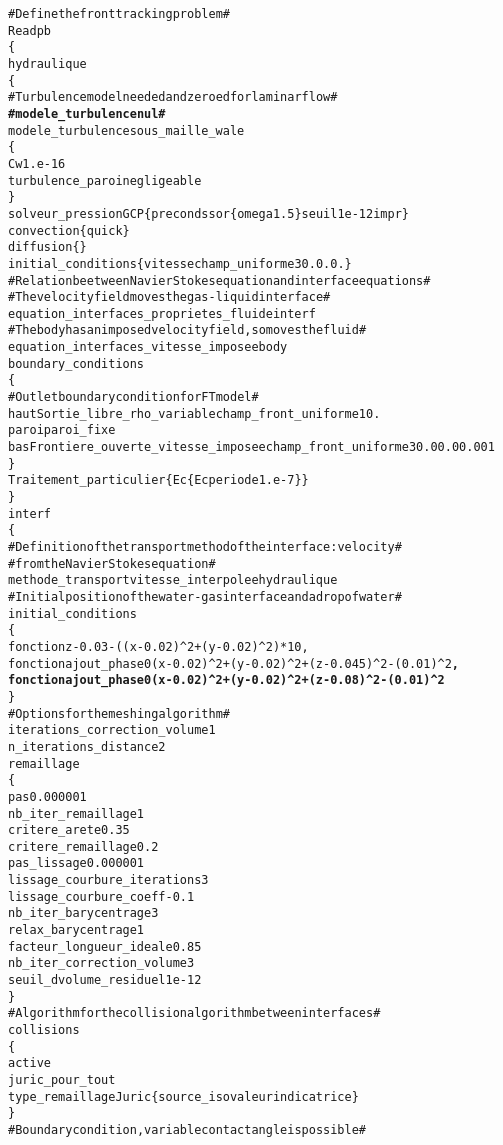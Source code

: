 \begin{alltt}
# Define the front tracking problem #
Read pb
\{
    hydraulique
    \{
        # Turbulence model needed and zeroed for laminar flow #
        {\bf{# modele_turbulence nul #}}
        modele_turbulence sous_maille_wale
        \{
            Cw               1.e-16
            turbulence_paroi negligeable
        \}
        solveur_pression GCP \{ precond ssor \{ omega 1.5 \} seuil 1e-12 impr \}
        convection           \{ quick \}
        diffusion            \{ \}
        initial_conditions \{ vitesse champ_uniforme 3 0. 0. 0. \}
        # Relation beetween Navier Stokes equation and interface equations #
        # The velocity field moves the gas-liquid interface #
        equation_interfaces_proprietes_fluide interf 
        # The body has an imposed velocity field, so moves the fluid #
        equation_interfaces_vitesse_imposee   body
        boundary_conditions
        \{
            # Outlet boundary condition for FT model #
            haut   Sortie_libre_rho_variable champ_front_uniforme 1 0.    
            paroi  paroi_fixe
            bas    Frontiere_ouverte_vitesse_imposee champ_front_uniforme 3 0.0 0.0 0.001
        \}
        Traitement_particulier \{ Ec \{ Ec periode 1.e-7 \} \}
    \}
    interf
    \{
        # Definition of the transport method of the interface: velocity #
        # from the Navier Stokes equation #
        methode_transport vitesse_interpolee hydraulique
        # Initial position of the water-gas interface and a drop of water #
        initial_conditions 
        \{
            fonction z-0.03-((x-0.02)^2+(y-0.02)^2)*10 ,
            fonction ajout_phase0 (x-0.02)^2+(y-0.02)^2+(z-0.045)^2-(0.01)^2 {\bf{,}}
            {\bf{fonction ajout_phase0 (x-0.02)^2+(y-0.02)^2+(z-0.08)^2-(0.01)^2 }}
        \}
        # Options for the meshing algorithm #
        iterations_correction_volume 1
        n_iterations_distance 2
        remaillage 
        \{
            pas 0.000001
            nb_iter_remaillage 1
            critere_arete 0.35
            critere_remaillage 0.2
            pas_lissage 0.000001
            lissage_courbure_iterations 3
            lissage_courbure_coeff -0.1
            nb_iter_barycentrage 3
            relax_barycentrage 1
            facteur_longueur_ideale 0.85
            nb_iter_correction_volume 3
            seuil_dvolume_residuel 1e-12
        \}
        # Algorithm for the collision algorithm between interfaces #
        collisions
        \{
            active
            juric_pour_tout
            type_remaillage Juric \{ source_isovaleur indicatrice \}
        \}
        # Boundary condition, variable contact angle is possible #

\end{alltt}
